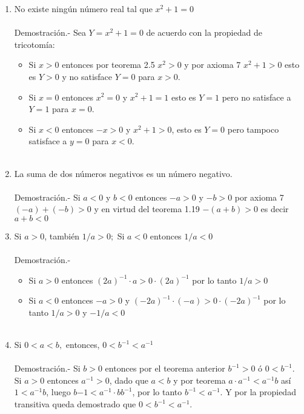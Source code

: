 \begin{enumerate}
\item No existe ningún número real tal que $x^2+1=0$\\\\
Demostración.- \; Sea $Y=x^2+1=0$ de acuerdo con la propiedad de tricotomía:
\begin{itemize}
\item Si $x>0$ entonces por teorema 2.5 \; $x^2>0$ y por axioma 7 \; $x^2+1>0$ esto es $Y > 0$ y no satisface $Y=0$ para $x>0$.
\item Si $x=0$ entonces $x^2=0$ y $x^2+1=1$ esto es $Y=1$ pero no satisface a $Y=1$ para $x=0$.
\item Si $x<0$ entonces $-x>0$ y $x^2+1>0$, esto es $Y=0$ pero tampoco satisface a $y=0$ para $x<0$.\\\\ 
\end{itemize}

\item La suma de dos números negativos es un número negativo.\\\\
Demostración.- \;   Si $a<0$ y $b<0$ entonces $-a>0$ y $-b>0$ por axioma 7 \; $(-a)+(-b)>0$ y en virtud del teorema 1.19 \; $-(a+b)>0$ es decir $a+b<0$\\

\item Si $a>0$, también $1/a>0;$ Si $a<0$ entonces $1/a<0$\\\\
Demostración.- \;
\begin{itemize}
\item Si $a>0$ entonces $(2a)^{-1}\cdot a > 0 \cdot (2a)^{-1}$ por lo tanto $1/a>0$
\item Si $a<0$ entonces $-a>0$ y $(-2a)^{-1}\cdot (-a)>0\cdot (-2a)^{-1}$ por lo tanto $1/a>0$ y $-1/a<0$\\\\
\end{itemize}

\item 
Si $0<a<b,$ entonces, $0<b^{-1}<a^{-1}$\\\\
Demostración.- \; Si $b>0$ entonces por el teorema anterior  $b^{-1}>0$ ó $0<b^{-1}$.\\
Si $a>0$ entonces $a^{-1}>0$, dado que $a<b$ y por teorema  \; $a\cdot a^{-1}< a^{-1}b$ así $1<a^{-1}b$, luego $b{-1}<a^{-1}\cdot bb^{-1}$, por lo tanto $b^{-1}<a^{-1}$. Y por la propiedad transitiva queda demostrado que $0<b^{-1}<a^{-1}$.\\\\


\end{enumerate}
